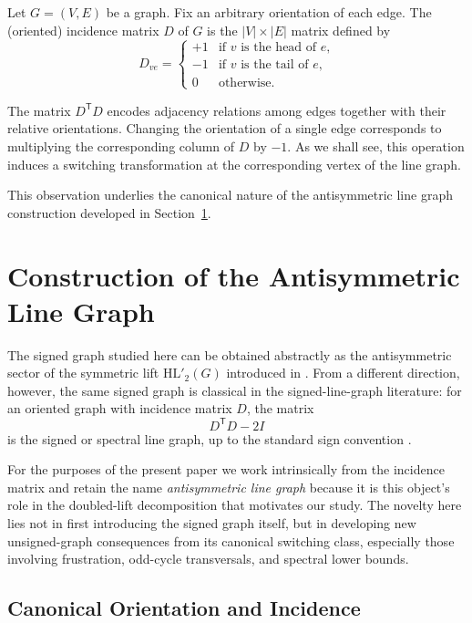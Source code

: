 \documentclass[11pt]{article}
\theoremstyle{plain}
\begin{document}
Let $G=(V,E)$ be a graph.
Fix an arbitrary orientation of each edge.
The (oriented) incidence matrix $D$ of $G$ is the $|V|\times|E|$ matrix defined by
\[
D_{ve} =
\begin{cases}
+1 & \text{if $v$ is the head of $e$,}\\
-1 & \text{if $v$ is the tail of $e$,}\\
0  & \text{otherwise.}
\end{cases}
\]

The matrix $D^{\mathsf T}D$ encodes adjacency relations among edges together with their
relative orientations.
Changing the orientation of a single edge corresponds to multiplying the
corresponding column of $D$ by $-1$.
As we shall see, this operation induces a switching transformation at the
corresponding vertex of the line graph.

This observation underlies the canonical nature of the antisymmetric line graph
construction developed in Section~\ref{sec:construction}.

\section{Construction of the Antisymmetric Line Graph}
\label{sec:construction}

The signed graph studied here can be obtained abstractly as the antisymmetric
sector of the symmetric lift $\mathrm{HL}'_2(G)$ introduced in \cite{BalHL}.
From a different direction, however, the same signed graph is classical in the
signed-line-graph literature: for an oriented graph with incidence matrix $D$,
the matrix
\[
D^{\mathsf T}D-2I
\]
is the signed or spectral line graph, up to the standard sign convention
\cite{GerminaHameedZaslavsky2011,Zaslavsky2010Matrices,BelardoPisanskiStanicZaslavsky2023}.

For the purposes of the present paper we work intrinsically from the incidence
matrix and retain the name \emph{antisymmetric line graph} because it is this
object's role in the doubled-lift decomposition that motivates our study. The
novelty here lies not in first introducing the signed graph itself, but in
developing new unsigned-graph consequences from its canonical switching class,
especially those involving frustration, odd-cycle transversals, and spectral
lower bounds.


\subsection{Canonical Orientation and Incidence}
\end{document}
